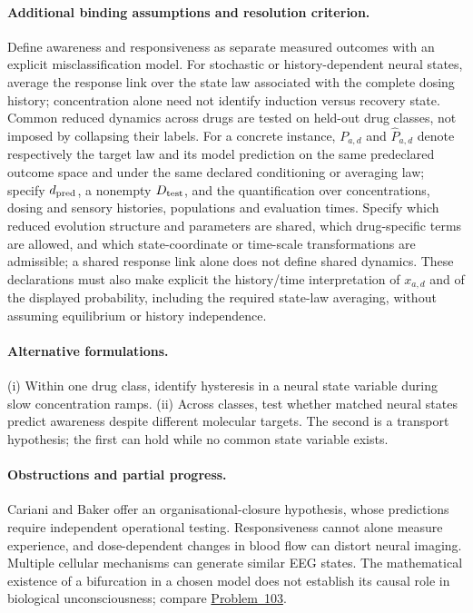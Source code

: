 \documentclass[11pt]{article}
\begin{document}
\paragraph{Additional binding assumptions and resolution criterion.} Define awareness and responsiveness as separate measured outcomes with an explicit misclassification model. For stochastic or history-dependent neural states, average the response link over the state law associated with the complete dosing history; concentration alone need not identify induction versus recovery state. Common reduced dynamics across drugs are tested on held-out drug classes, not imposed by collapsing their labels. For a concrete instance, $P_{a,d}$ and $\widehat P_{a,d}$ denote respectively the target law and its model prediction on the same predeclared outcome space and under the same declared conditioning or averaging law; specify $d_{\rm pred}$, a nonempty $D_{\rm test}$, and the quantification over concentrations, dosing and sensory histories, populations and evaluation times. Specify which reduced evolution structure and parameters are shared, which drug-specific terms are allowed, and which state-coordinate or time-scale transformations are admissible; a shared response link alone does not define shared dynamics. These declarations must also make explicit the history/time interpretation of $x_{a,d}$ and of the displayed probability, including the required state-law averaging, without assuming equilibrium or history independence.

\paragraph{Alternative formulations.} (i) Within one drug class, identify hysteresis in a neural state variable during slow concentration ramps. (ii) Across classes, test whether matched neural states predict awareness despite different molecular targets. The second is a transport hypothesis; the first can hold while no common state variable exists.
\paragraph{Obstructions and partial progress.} Cariani and Baker offer an organisational-closure hypothesis, whose predictions require independent operational testing. Responsiveness cannot alone measure experience, and dose-dependent changes in blood flow can distort neural imaging. Multiple cellular mechanisms can generate similar EEG states. The mathematical existence of a bifurcation in a chosen model does not establish its causal role in biological unconsciousness; compare \href{https://we-solve.github.io/problems/interventional-prediction-of-reported-visual-awareness-4fd05b37/}{Problem~103}.
\end{document}

